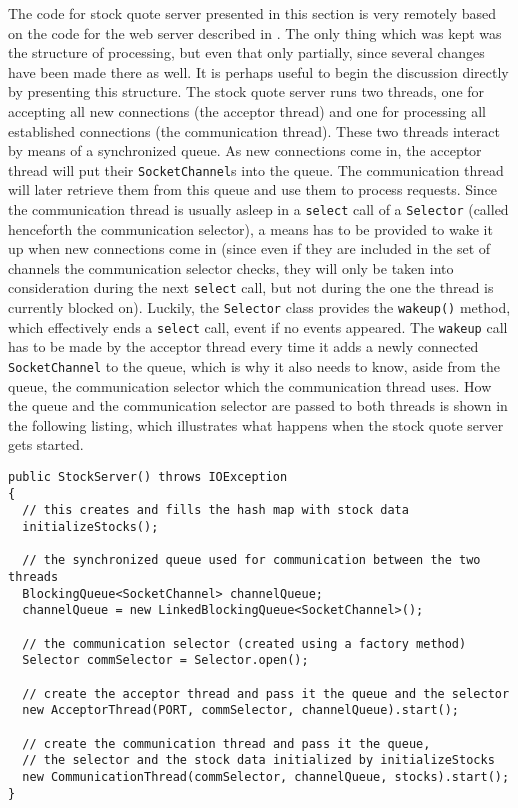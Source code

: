 \documentclass[a4paper,10pt]{article}
\begin{document}
The code for stock quote server presented in this section is very remotely based on the code for the web server described in
\cite{merlin}. The only thing which was kept was the structure of processing, but even that only partially, since several changes
have been made there as well. It is perhaps useful to begin the discussion directly by presenting this structure. The stock quote
server runs two threads, one for accepting all new connections (the acceptor thread) and one for processing all established
connections (the communication thread). These two threads interact by means of a synchronized queue. As new connections
come in, the acceptor thread will put their \texttt{SocketChannel}s into the queue. The communication thread will later
retrieve them from this queue and use them to process requests. Since the communication thread is usually asleep in a
\texttt{select} call of a \texttt{Selector} (called henceforth the communication selector), a means has to be provided to wake it up when new
connections come in (since even if they are included in the set of channels the communication selector checks, they will only
be taken into consideration during the next \texttt{select} call, but not during the one the thread is currently blocked on). Luckily, the
\texttt{Selector} class provides the \texttt{wakeup()} method, which effectively ends a \texttt{select} call, event if no events appeared.
The \texttt{wakeup} call has to be made by the acceptor thread every time it adds a newly connected \texttt{SocketChannel} to the
queue, which is why it also needs to know, aside from the queue, the communication selector which the communication thread uses. How the queue
and the communication selector are passed to both threads is shown in the following listing, which illustrates what happens
when the stock quote server gets started.

\begin{lstlisting}
public StockServer() throws IOException
{
  // this creates and fills the hash map with stock data
  initializeStocks();

  // the synchronized queue used for communication between the two threads
  BlockingQueue<SocketChannel> channelQueue;
  channelQueue = new LinkedBlockingQueue<SocketChannel>();

  // the communication selector (created using a factory method)
  Selector commSelector = Selector.open();

  // create the acceptor thread and pass it the queue and the selector
  new AcceptorThread(PORT, commSelector, channelQueue).start();

  // create the communication thread and pass it the queue,
  // the selector and the stock data initialized by initializeStocks
  new CommunicationThread(commSelector, channelQueue, stocks).start();
}
\end{lstlisting}
\end{document}
